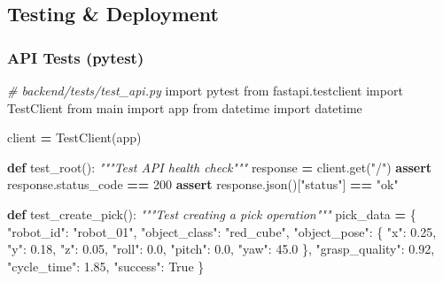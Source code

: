 \documentclass[
]{article}
\newenvironment{Shaded}{\begin{snugshade}}{\end{snugshade}}
\newcommand{\CommentTok}[1]{\textcolor[rgb]{0.56,0.35,0.01}{\textit{#1}}}
\newcommand{\ControlFlowTok}[1]{\textcolor[rgb]{0.13,0.29,0.53}{\textbf{#1}}}
\newcommand{\DecValTok}[1]{\textcolor[rgb]{0.00,0.00,0.81}{#1}}
\newcommand{\FloatTok}[1]{\textcolor[rgb]{0.00,0.00,0.81}{#1}}
\newcommand{\ImportTok}[1]{#1}
\newcommand{\KeywordTok}[1]{\textcolor[rgb]{0.13,0.29,0.53}{\textbf{#1}}}
\newcommand{\NormalTok}[1]{#1}
\newcommand{\OperatorTok}[1]{\textcolor[rgb]{0.81,0.36,0.00}{\textbf{#1}}}
\newcommand{\StringTok}[1]{\textcolor[rgb]{0.31,0.60,0.02}{#1}}
\newcommand{\VariableTok}[1]{\textcolor[rgb]{0.00,0.00,0.00}{#1}}
\begin{document}
\hypertarget{testing-deployment}{%
\subsection{Testing \& Deployment}\label{testing-deployment}}

\hypertarget{api-tests-pytest}{%
\subsubsection{API Tests (pytest)}\label{api-tests-pytest}}

\begin{Shaded}
\begin{Highlighting}[]
\CommentTok{\# backend/tests/test\_api.py}
\ImportTok{import}\NormalTok{ pytest}
\ImportTok{from}\NormalTok{ fastapi.testclient }\ImportTok{import}\NormalTok{ TestClient}
\ImportTok{from}\NormalTok{ main }\ImportTok{import}\NormalTok{ app}
\ImportTok{from}\NormalTok{ datetime }\ImportTok{import}\NormalTok{ datetime}

\NormalTok{client }\OperatorTok{=}\NormalTok{ TestClient(app)}

\KeywordTok{def}\NormalTok{ test\_root():}
    \CommentTok{"""Test API health check"""}
\NormalTok{    response }\OperatorTok{=}\NormalTok{ client.get(}\StringTok{"/"}\NormalTok{)}
    \ControlFlowTok{assert}\NormalTok{ response.status\_code }\OperatorTok{==} \DecValTok{200}
    \ControlFlowTok{assert}\NormalTok{ response.json()[}\StringTok{"status"}\NormalTok{] }\OperatorTok{==} \StringTok{"ok"}

\KeywordTok{def}\NormalTok{ test\_create\_pick():}
    \CommentTok{"""Test creating a pick operation"""}
\NormalTok{    pick\_data }\OperatorTok{=}\NormalTok{ \{}
        \StringTok{"robot\_id"}\NormalTok{: }\StringTok{"robot\_01"}\NormalTok{,}
        \StringTok{"object\_class"}\NormalTok{: }\StringTok{"red\_cube"}\NormalTok{,}
        \StringTok{"object\_pose"}\NormalTok{: \{}
            \StringTok{"x"}\NormalTok{: }\FloatTok{0.25}\NormalTok{,}
            \StringTok{"y"}\NormalTok{: }\FloatTok{0.18}\NormalTok{,}
            \StringTok{"z"}\NormalTok{: }\FloatTok{0.05}\NormalTok{,}
            \StringTok{"roll"}\NormalTok{: }\FloatTok{0.0}\NormalTok{,}
            \StringTok{"pitch"}\NormalTok{: }\FloatTok{0.0}\NormalTok{,}
            \StringTok{"yaw"}\NormalTok{: }\FloatTok{45.0}
\NormalTok{        \},}
        \StringTok{"grasp\_quality"}\NormalTok{: }\FloatTok{0.92}\NormalTok{,}
        \StringTok{"cycle\_time"}\NormalTok{: }\FloatTok{1.85}\NormalTok{,}
        \StringTok{"success"}\NormalTok{: }\VariableTok{True}
\NormalTok{    \}}


\end{Highlighting}
\end{Shaded}
\end{document}

